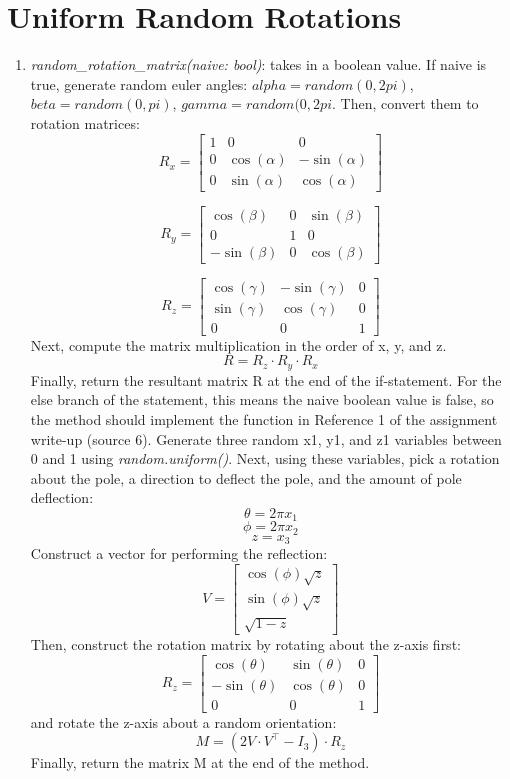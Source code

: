 \documentclass{article}
\begin{document}
\section{Uniform Random Rotations}
\begin{enumerate}
    \item \textit{random\_rotation\_matrix(naive: bool)}: takes in a boolean value. If naive is true, generate random euler angles: \(alpha = random(0, 2pi)\), \(beta = random(0, pi)\), \(gamma = random(0, 2pi\). Then, convert them to rotation matrices:
\[
R_x = \begin{bmatrix}
1 & 0 & 0 \\
0 & \cos(\alpha) & -\sin(\alpha) \\
0 & \sin(\alpha) & \cos(\alpha)
\end{bmatrix}
\]

\[
R_y = \begin{bmatrix}
\cos(\beta) & 0 & \sin(\beta) \\
0 & 1 & 0 \\
-\sin(\beta) & 0 & \cos(\beta)
\end{bmatrix}
\]

\[
R_z = \begin{bmatrix}
\cos(\gamma) & -\sin(\gamma) & 0 \\
\sin(\gamma) & \cos(\gamma) & 0 \\
0 & 0 & 1
\end{bmatrix}
\]
Next, compute the matrix multiplication in the order of x, y, and z.
\[
R = R_z \cdot R_y \cdot R_x
\]
Finally, return the resultant matrix R at the end of the if-statement. For the else branch of the statement, this means the naive boolean value is false, so the method should implement the function in Reference 1 of the assignment write-up (source 6). Generate three random x1, y1, and z1 variables between 0 and 1 using \textit{random.uniform()}. Next, using these variables, pick a rotation about the pole, a direction to deflect the pole, and the amount of pole deflection:
\[
\theta = 2 \pi x_1
\]
\[
\phi = 2 \pi x_2
\]
\[
z = x_3
\]
Construct a vector for performing the reflection:
\[
V = \begin{bmatrix}
\cos(\phi) \sqrt{z} \\
\sin(\phi) \sqrt{z} \\
\sqrt{1 - z}
\end{bmatrix}
\]
Then, construct the rotation matrix by rotating about the z-axis first:
\[
R_z = \begin{bmatrix}
\cos(\theta) & \sin(\theta) & 0 \\
-\sin(\theta) & \cos(\theta) & 0 \\
0 & 0 & 1
\end{bmatrix}
\]
and rotate the z-axis about a random orientation:
\[
M = \left( 2 V \cdot V^\top - I_3 \right) \cdot R_z
\]
Finally, return the matrix M at the end of the method.



\end{enumerate}
\end{document}
